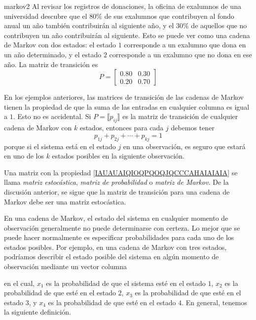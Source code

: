 \begin{examplebox}{}{markov2}
    Al revisar los registros de donaciones, la oficina de exalumnos de una universidad descubre que el $80\%$ de sus exalumnos que contribuyen al fondo anual un año también contribuirán al siguiente año, y el $30\%$ de aquellos que no contribuyen un año contribuirán al siguiente. Esto se puede ver como una cadena de Markov con dos estados: el estado $1$ corresponde a un exalumno que dona en un año determinado, y el estado $2$ corresponde a un exalumno que no dona en ese año. La matriz de transición es
    $$P = \begin{bmatrix}
        0.80 & 0.30 \\
        0.20 & 0.70
    \end{bmatrix}$$
\end{examplebox}

En los ejemplos anteriores, las matrices de transición de las cadenas de Markov tienen la propiedad de que la suma de las entradas en cualquier columna es igual a $1$. Esto no es accidental. Si $P = \lBrack p_{ij} \rBrack$ es la matriz de transición de cualquier cadena de Markov con $k$ estados, entonces para cada $j$ debemos tener
\begin{equation}
    p_{1j} + p_{2j} + \cdots + p_{kj} = 1 \label{IAUAUAIQIOQPQOQJQCCCAHAIAIAIA}
\end{equation}
porque si el sistema está en el estado $j$ en una observación, es seguro que estará en uno de los $k$ estados posibles en la siguiente observación.

Una matriz con la propiedad \eqref{IAUAUAIQIOQPQOQJQCCCAHAIAIAIA} se llama \emph{matriz estocástica}, \emph{matriz de probabilidad} o \emph{matriz de Markov}. De la discusión anterior, se sigue que la matriz de transición para una cadena de Markov debe ser una matriz estocástica.

\newpage

En una cadena de Markov, el estado del sistema en cualquier momento de observación generalmente no puede determinarse con certeza. Lo mejor que se puede hacer normalmente es especificar probabilidades para cada uno de los estados posibles. Por ejemplo, en una cadena de Markov con tres estados, podríamos describir el estado posible del sistema en algún momento de observación mediante un vector columna
\begin{matrizn}
\end{matrizn}
en el cual, $x_1$ es la probabilidad de que el sistema esté en el estado $1$, $x_2$ es la probabilidad de que esté en el estado $2$, $x_3$ es la probabilidad de que esté en el estado $3$, y $x_4$ es la probabilidad de que esté en el estado $4$. En general, tenemos la siguiente definición.

